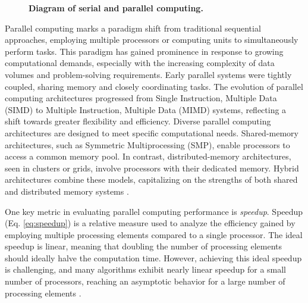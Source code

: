 \documentclass[Ingles]{phdthesis}
\begin{document}
\begin{figure}
  \caption[Diagram of serial and parallel computing]{\textbf{Diagram of serial and parallel computing.}}
  \label{fig:computing-strategies}
\end{figure}

Parallel computing marks a paradigm shift from traditional sequential approaches, employing multiple processors or computing units to simultaneously perform tasks. This paradigm has gained prominence in response to growing computational demands, especially with the increasing complexity of data volumes and problem-solving requirements. Early parallel systems were tightly coupled, sharing memory and closely coordinating tasks. The evolution of parallel computing architectures progressed from Single Instruction, Multiple Data (SIMD) to Multiple Instruction, Multiple Data (MIMD) systems, reflecting a shift towards greater flexibility and efficiency. Diverse parallel computing architectures are designed to meet specific computational needs. Shared-memory architectures, such as Symmetric Multiprocessing (SMP), enable processors to access a common memory pool. In contrast, distributed-memory architectures, seen in clusters or grids, involve processors with their dedicated memory. Hybrid architectures combine these models, capitalizing on the strengths of both shared and distributed memory systems \cite{matloff2012}.

One key metric in evaluating parallel computing performance is \textit{speedup}. Speedup (Eq. \ref{eq:speedup}) is a relative measure used to analyze the efficiency gained by employing multiple processing elements compared to a single processor. The ideal speedup is linear, meaning that doubling the number of processing elements should ideally halve the computation time. However, achieving this ideal speedup is challenging, and many algorithms exhibit nearly linear speedup for a small number of processors, reaching an asymptotic behavior for a large number of processing elements \cite{grama2003,matloff2012}.
\end{document}
